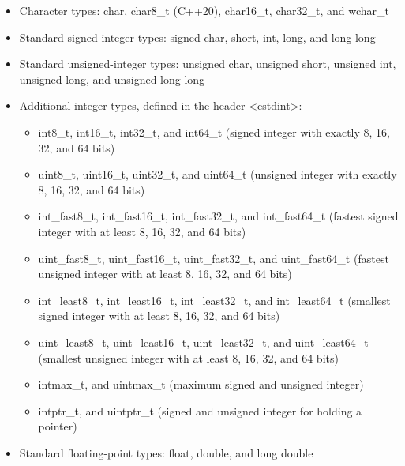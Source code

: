 \begin{itemize}
\item 
Character types: char, char8\_t (C++20), char16\_t, char32\_t, and wchar\_t

\item 
Standard signed-integer types: signed char, short, int, long, and long long

\item 
Standard unsigned-integer types: unsigned char, unsigned short, unsigned int, unsigned long, and unsigned long long

\item 
Additional integer types, defined in the header \href{http://en.cppreference.com/w/cpp/header/cstdint}{<cstdint>}:
\begin{itemize}
\item 
int8\_t, int16\_t, int32\_t, and int64\_t (signed integer with exactly 8, 16, 32, and 64 bits)

\item 
uint8\_t, uint16\_t, uint32\_t, and uint64\_t (unsigned integer with exactly 8, 16, 32, and 64 bits)

\item 
int\_fast8\_t, int\_fast16\_t, int\_fast32\_t, and int\_fast64\_t (fastest signed integer with at least 8, 16, 32, and 64 bits)

\item 
uint\_fast8\_t, uint\_fast16\_t, uint\_fast32\_t, and uint\_fast64\_t (fastest unsigned integer with at least 8, 16, 32, and 64 bits)

\item 
int\_least8\_t, int\_least16\_t, int\_least32\_t, and int\_least64\_t (smallest signed integer with at least 8, 16, 32, and 64 bits)

\item 
uint\_least8\_t, uint\_least16\_t, uint\_least32\_t, and uint\_least64\_t (smallest unsigned integer with at least 8, 16, 32, and 64 bits)

\item 
intmax\_t, and uintmax\_t (maximum signed and unsigned integer)

\item 
intptr\_t, and uintptr\_t (signed and unsigned integer for holding a pointer)
\end{itemize}

\item 
Standard floating-point types: float, double, and long double
\end{itemize}

